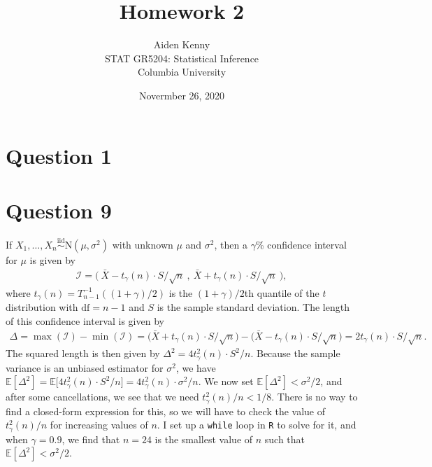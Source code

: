 \documentclass[10pt]{article}
\title{
    {\Large Homework 2}
}
\author{
    {\normalsize Aiden Kenny}\\
    {\normalsize STAT GR5204: Statistical Inference}\\
    {\normalsize Columbia University}
}
\date{\normalsize Novermber 26, 2020}
\begin{document}
\maketitle

\section{Question 1} \noindent


\section{Question 9} \noindent
If \(X_1, \ldots, X_n \overset{\mathrm{iid}}{\sim} \mathrm{N}(\mu, \sigma^2)\) with unknown \(\mu\) and \(\sigma^2\), then a \(\gamma\)\%{} confidence interval
for \(\mu\) is given by 
\begin{align*}
    \mathcal{I} = \Big( ~\bar{X} - t_{\gamma}(n) \cdot S / \sqrt{n} ~,~ \bar{X} + t_{\gamma}(n) \cdot S / \sqrt{n} ~ \Big),
\end{align*}
where \(t_{\gamma}(n) = T_{n-1}^{-1} ( (1 + \gamma) / 2 )\) is the \((1 + \gamma) / 2\)th quantile of the \(t\) distribution with \(\mathrm{df} = n-1\) and \(S\)
is the sample standard deviation. 
The length of this confidence interval is given by 
\begin{align*}
    \Delta 
    = \max (\mathcal{I}) - \min (\mathcal{I})
    = \Big( \bar{X} + t_{\gamma}(n) \cdot S / \sqrt{n} \Big) - \Big( \bar{X} - t_{\gamma}(n) \cdot S / \sqrt{n} \Big)
    = 2 t_{\gamma}(n) \cdot S / \sqrt{n}.
\end{align*}
The squared length is then given by \(\Delta^2 = 4 t_{\gamma}^2(n) \cdot S^2 / n\). 
Because the sample variance is an unbiased estimator for \(\sigma^2\), we have \(\mathbb{E}[\Delta^2] = \mathbb{E} \big[ 4 t_{\gamma}^2(n) \cdot S^2 / n \big] = 4 t_{\gamma}^2(n) \cdot \sigma^2 / n\).
We now set \(\mathbb{E}[\Delta^2] < \sigma^2 / 2\), and after some cancellations, we see that we need \(t_{\gamma}^2(n) / n < 1/8\). There is no way to find a
closed-form expression for this, so we will have to check the value of \(t_{\gamma}^2(n) / n\) for increasing values of \(n\). I set up a \texttt{while} 
loop in \texttt{R} to solve for it, and when \(\gamma = 0.9\), we find that \(n = 24\) is the smallest value of \(n\) such that \(\mathbb{E}[\Delta^2] < \sigma^2 / 2\).
\end{document}
